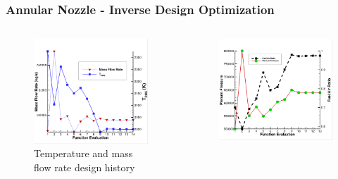 \documentclass{beamer}
\begin{document}
\begin{frame}
  \frametitle{Annular Nozzle - Inverse Design Optimization}
  \vspace{-0.5cm}
  \begin{columns}
    \begin{column}{0.5\textwidth}
      \centering
      \begin{figure}[h]
        \centering
        \includegraphics[width=\textwidth]{figures/1st-H2/fm_hist.png}
        \caption{Temperature and mass flow rate design history}
        \label{fig:fm-hist}
      \end{figure}
    \end{column}
    \begin{column}{0.5\textwidth}
      \centering
      \begin{figure}[h]
        \centering
        \includegraphics[width=\textwidth]{figures/1st-H2/dv_hist.png}

\end{figure}
\end{column}
\end{columns}
\end{frame}
\end{document}
